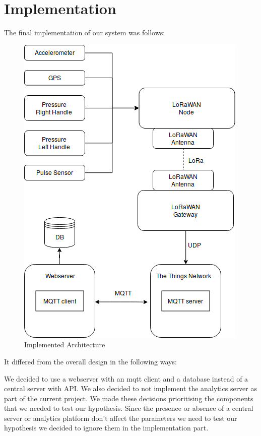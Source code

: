 \chapter{Implementation}
\label{cha:implementation}

The final implementation of our system was follows:
\begin{figure}[h]
\centering
\includegraphics[width=1\linewidth]{gfx/architecture_implementation_h}
\caption[]{Implemented Architecture}
\label{fig:image2}
\end{figure}

It differed from the overall design in the following ways:

We decided to use a webserver with an mqtt client and a database instead of a central server with API. We also decided to not implement the analytics server as part of the current project. We made these decisions prioritising the components that we needed to test our hypothesis. Since the presence or absence of a central server or analytics platform don't affect the parameters we need to test our hypothesis we decided to ignore them in the implementation part.

